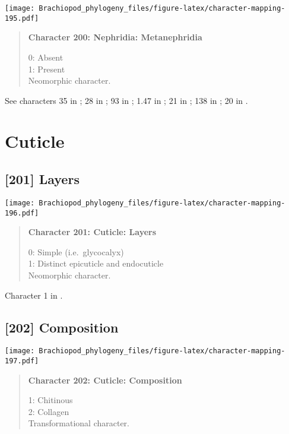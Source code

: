 \documentclass[openany]{book}
\theoremstyle{definition}
\theoremstyle{definition}
\theoremstyle{definition}
\theoremstyle{remark}
\begin{document}
\texttt{[image: Brachiopod\_phylogeny\_files/figure-latex/character-mapping-195.pdf]}

\begin{quote}
\textbf{Character 200: Nephridia: Metanephridia}

0: Absent\\
1: Present\\
Neomorphic character.
\end{quote}

See characters 35 in \citet{Rouse1999}; 28 in \citet{Haszprunar2000}; 93
in \citet{Glenner2004}; 1.47 in \citet{SPS1996}; 21 in
\citet{Grobe2007}; 138 in \citet{Rouse1999}; 20 in
\citet{Haszprunar1996}.

\section{Cuticle}\label{cuticle}

\subsection*{{[}201{]} Layers}\label{layers}

\texttt{[image: Brachiopod\_phylogeny\_files/figure-latex/character-mapping-196.pdf]}

\begin{quote}
\textbf{Character 201: Cuticle: Layers}

0: Simple (i.e.~glycocalyx)\\
1: Distinct epicuticle and endocuticle\\
Neomorphic character.
\end{quote}

Character 1 in \citet{Haszprunar1996}.

\subsection*{{[}202{]} Composition}\label{composition}

\texttt{[image: Brachiopod\_phylogeny\_files/figure-latex/character-mapping-197.pdf]}

\begin{quote}
\textbf{Character 202: Cuticle: Composition}

1: Chitinous\\
2: Collagen\\
Transformational character.
\end{quote}
\end{document}
